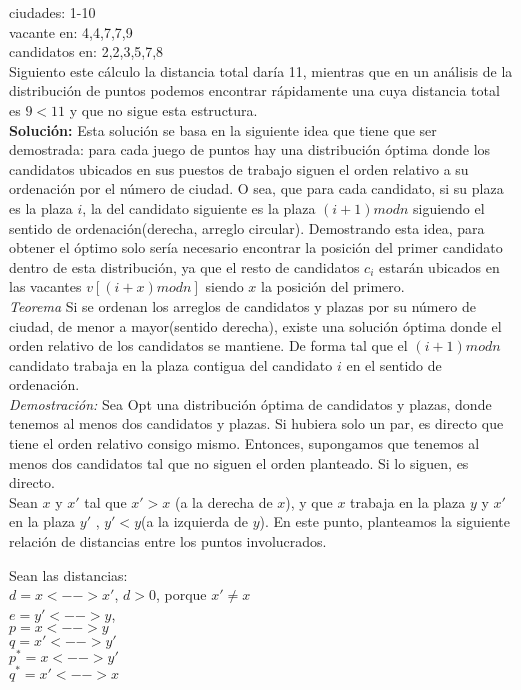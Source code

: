 \documentclass{article}
\begin{document}
ciudades: 1-10\\
vacante en: 4,4,7,7,9 \\ 
candidatos en: 2,2,3,5,7,8\\

Siguiento este c\'alculo la distancia total dar\'ia 11, mientras que en un an\'alisis de la distribuci\'on de puntos podemos encontrar r\'apidamente una cuya distancia total es $9<11$ y que no sigue esta estructura.\\

\textbf{Soluci\'on:} Esta soluci\'on se basa en la siguiente idea que tiene que ser demostrada: para cada juego de puntos hay una distribuci\'on \'optima donde los candidatos ubicados en sus puestos de trabajo siguen el orden relativo a su ordenaci\'on por el n\'umero de ciudad. O sea, que para cada candidato, si su plaza es la plaza $i$, la del candidato siguiente es la plaza $(i+1)mod n $ siguiendo el sentido de ordenaci\'on(derecha, arreglo circular). Demostrando esta idea, para obtener el \'optimo solo ser\'ia necesario encontrar la posici\'on del primer candidato dentro de esta distribuci\'on, ya que el resto de candidatos $c_i$ estar\'an ubicados en las vacantes $v[(i+x)mod n]$ siendo $x$ la posici\'on del primero.\\

\textit{Teorema} Si se ordenan los arreglos de candidatos y plazas por su n\'umero de ciudad, de menor a mayor(sentido derecha), existe una soluci\'on \'optima donde el orden relativo de los candidatos se mantiene. De forma tal que el $(i+1)mod n$ candidato trabaja en la plaza contigua del candidato $i$ en el sentido de ordenaci\'on.\\

\textit{Demostraci\'on:} Sea Opt una distribuci\'on \'optima de candidatos y plazas, donde tenemos al menos dos candidatos y plazas. Si hubiera solo un par, es directo que tiene el orden relativo consigo mismo. Entonces, supongamos que tenemos al menos dos candidatos tal que no siguen el orden planteado. Si lo siguen, es directo.\\
Sean $x$ y $x'$ tal que $x'>x$ (a la derecha de $x$), y que $x$ trabaja en la plaza $y$ y $x'$ en la plaza $y'$ , $y'<y$(a la izquierda de $y$). En este punto, planteamos la siguiente relaci\'on de distancias entre los puntos involucrados.

Sean las distancias:\\
$d = x<-->x'$, $d>0$, porque $x'\neq x$\\
$e = y'<--> y$,\\
$p = x<-->y$\\
$q = x'<-->y'$\\
$p^* = x<-->y'$\\
$q^* = x'<-->x$\\
\end{document}
